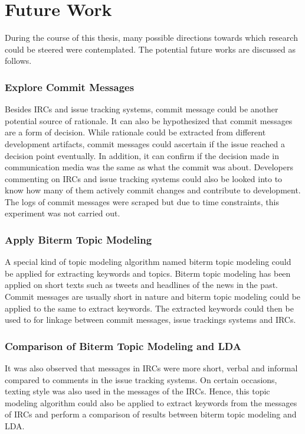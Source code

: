 \documentclass[a4paper,12pt,twoside]{report}
\begin{document}
\section{Future Work}
During the course of this thesis, many possible directions towards which research could be steered were contemplated. The potential future works are discussed as follows. 

\subsubsection{Explore Commit Messages}
Besides \acs{IRC}s and issue tracking systems, commit message could be another potential source of rationale. It can also be hypothesized that commit messages are a form of decision. While rationale could be extracted from different development artifacts, commit messages could ascertain if the issue reached a decision point eventually. In addition, it can confirm if the decision made in communication media was the same as what the commit was about. Developers commenting on \acs{IRC}s and issue tracking systems could also be looked into to know how many of them actively commit changes and contribute to development. The logs of commit messages were scraped but due to time constraints, this experiment was not carried out. 

\subsubsection{Apply Biterm Topic Modeling}
A special kind of topic modeling algorithm named biterm topic modeling could be applied for extracting keywords and topics. Biterm topic modeling has been applied on short texts such as tweets and headlines of the news in the past. Commit messages are usually short in nature and biterm topic modeling could be applied to the same to extract keywords. The extracted keywords could then be used to for linkage between commit messages, issue trackings systems and \acs{IRC}s. 

\subsubsection{Comparison of Biterm Topic Modeling and \acs{LDA}}
It was also observed that messages in \acs{IRC}s were more short, verbal and informal compared to comments in the issue tracking systems. On certain occasions, texting style was also used in the messages of the \acs{IRC}s. Hence, this topic modeling algorithm could also be applied to extract keywords from the messages of \acs{IRC}s and perform a comparison of results between biterm topic modeling and \acs{LDA}. 
\end{document}
